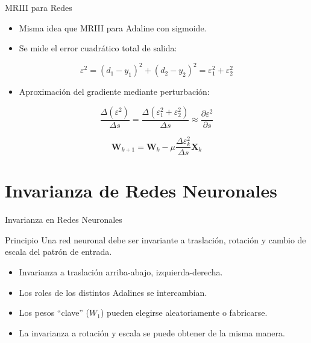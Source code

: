 \documentclass[aspectratio=169,utf8,spanish]{beamer}
\begin{document}
\begin{frame}{MRIII para Redes}
  \begin{itemize}
    \item Misma idea que MRIII para Adaline con sigmoide.
    \item Se mide el error cuadrático total de salida:
  \end{itemize}
  \begin{equation*}
    \varepsilon^2 = (d_1 - y_1)^2 + (d_2 - y_2)^2 = \varepsilon_1^2 + \varepsilon_2^2
  \end{equation*}

  \begin{itemize}
    \item Aproximación del gradiente mediante perturbación:
  \end{itemize}
  \begin{equation*}
    \frac{\Delta(\varepsilon^2)}{\Delta s} = \frac{\Delta(\varepsilon_1^2 + \varepsilon_2^2)}{\Delta s} \approx \frac{\partial \varepsilon^2}{\partial s}
  \end{equation*}

  \begin{equation*}
    \mathbf{W}_{k+1} = \mathbf{W}_k - \mu \frac{\Delta\varepsilon_k^2}{\Delta s} \mathbf{X}_k
  \end{equation*}
\end{frame}

\section{Invarianza de Redes Neuronales}

\begin{frame}{Invarianza en Redes Neuronales}
  \begin{block}{Principio}
    Una red neuronal debe ser invariante a traslación, rotación y cambio de escala del patrón de entrada.
  \end{block}

  \begin{itemize}
    \item Invarianza a traslación arriba-abajo, izquierda-derecha.
    \item Los roles de los distintos Adalines se intercambian.
    \item Los pesos ``clave'' ($W_1$) pueden elegirse aleatoriamente o fabricarse.
    \item La invarianza a rotación y escala se puede obtener de la misma manera.
  \end{itemize}
\end{frame}
\end{document}
